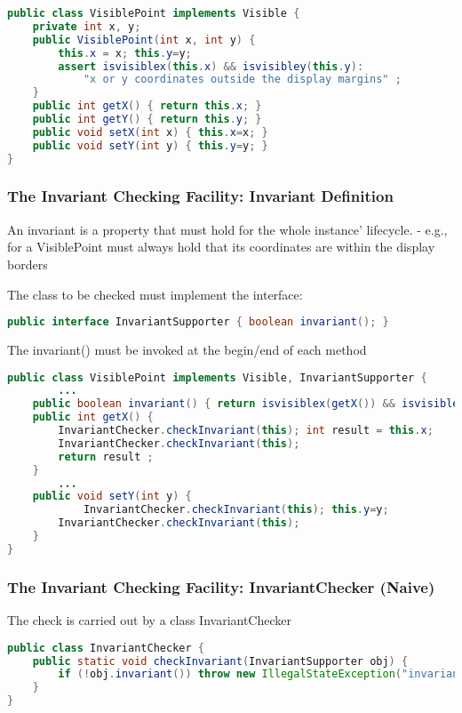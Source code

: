 \begin{lstlisting}[language=Java]
public class VisiblePoint implements Visible {
	private int x, y;
	public VisiblePoint(int x, int y) {
		this.x = x; this.y=y;
		assert isvisiblex(this.x) && isvisibley(this.y):
			"x or y coordinates outside the display margins" ;
	}
	public int getX() { return this.x; }
	public int getY() { return this.y; }
	public void setX(int x) { this.x=x; }
	public void setY(int y) { this.y=y; }
}
\end{lstlisting}

\subsubsection{The Invariant Checking Facility: Invariant Definition}
An invariant is a property that must hold for the whole instance' lifecycle.
- e.g., for a VisiblePoint must always hold that its coordinates are within the display borders

The class to be checked must implement the interface:

\begin{lstlisting}[language=Java]
public interface InvariantSupporter { boolean invariant(); }
\end{lstlisting}

The invariant() must be invoked at the begin/end of each method

\begin{lstlisting}[language=Java]
public class VisiblePoint implements Visible, InvariantSupporter {
		...
	public boolean invariant() { return isvisiblex(getX()) && isvisibley(getY()) ; }
	public int getX() {
		InvariantChecker.checkInvariant(this); int result = this.x;
		InvariantChecker.checkInvariant(this);
		return result ;
	}
		...
	public void setY(int y) {
			InvariantChecker.checkInvariant(this); this.y=y;
		InvariantChecker.checkInvariant(this);
	}
}
\end{lstlisting}

\subsubsection{The Invariant Checking Facility: InvariantChecker (Naive)}

The check is carried out by a class InvariantChecker

\begin{lstlisting}[language=Java]
public class InvariantChecker {
	public static void checkInvariant(InvariantSupporter obj) {
		if (!obj.invariant()) throw new IllegalStateException("invariant failure");
	}
}
\end{lstlisting}

